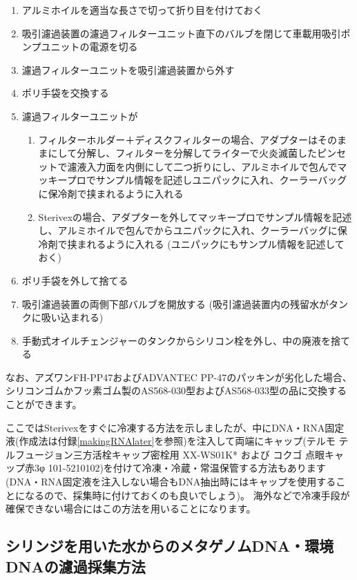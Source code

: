 \documentclass[titlepage,10pt,a4paper,uplatex]{jsbook}
\begin{document}
\begin{enumerate}
\item アルミホイルを適当な長さで切って折り目を付けておく
\item 吸引濾過装置の濾過フィルターユニット直下のバルブを閉じて車載用吸引ポンプユニットの電源を切る
\item 濾過フィルターユニットを吸引濾過装置から外す
\item ポリ手袋を交換する
\item 濾過フィルターユニットが
\begin{enumerate}
\item フィルターホルダー＋ディスクフィルターの場合、アダプターはそのままにして分解し、フィルターを分解してライターで火炎滅菌したピンセットで濾液入力面を内側にして二つ折りにし、アルミホイルで包んでマッキープロでサンプル情報を記述しユニパックに入れ、クーラーバッグに保冷剤で挟まれるように入れる
\item Sterivexの場合、アダプターを外してマッキープロでサンプル情報を記述し、アルミホイルで包んでからユニパックに入れ、クーラーバッグに保冷剤で挟まれるように入れる (ユニパックにもサンプル情報を記述しておく)
\end{enumerate}
\item ポリ手袋を外して捨てる
\item 吸引濾過装置の両側下部バルブを開放する (吸引濾過装置内の残留水がタンクに吸い込まれる)
\item 手動式オイルチェンジャーのタンクからシリコン栓を外し、中の廃液を捨てる
\end{enumerate}

なお、アズワンFH-PP47およびADVANTEC PP-47のパッキンが劣化した場合、シリコンゴムかフッ素ゴム製のAS568-030型およびAS568-033型の品に交換することができます。

ここではSterivexをすぐに冷凍する方法を示しましたが、中にDNA・RNA固定液(作成法は付録\ref{makingRNAlater}を参照)を注入して両端にキャップ(テルモ テルフュージョン三方活栓キャップ密栓用 XX-WS01K* および コクゴ 点眼キャップ赤3φ 101-5210102)を付けて冷凍・冷蔵・常温保管する方法もあります(DNA・RNA固定液を注入しない場合もDNA抽出時にはキャップを使用することになるので、採集時に付けておくのも良いでしょう)。
海外などで冷凍手段が確保できない場合にはこの方法を用いることになります。

\subsection{シリンジを用いた水からのメタゲノムDNA・環境DNAの濾過採集方法}
\end{document}
